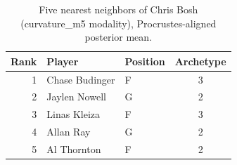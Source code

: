 \begin{table}[htbp]
  \centering\small
  \begin{tabular}{rllc}
    \toprule
    Rank & Player & Position & Archetype \\
    \midrule
    1 & Chase Budinger & F & 3 \\
    2 & Jaylen Nowell & G & 2 \\
    3 & Linas Kleiza & F & 3 \\
    4 & Allan Ray & G & 2 \\
    5 & Al Thornton & F & 2 \\
    \bottomrule
  \end{tabular}
  \caption{Five nearest neighbors of Chris Bosh (curvature_m5 modality), Procrustes-aligned posterior mean.}
  \label{tab:Chris_Bosh_neighbors_curvature_m5}
\end{table}

